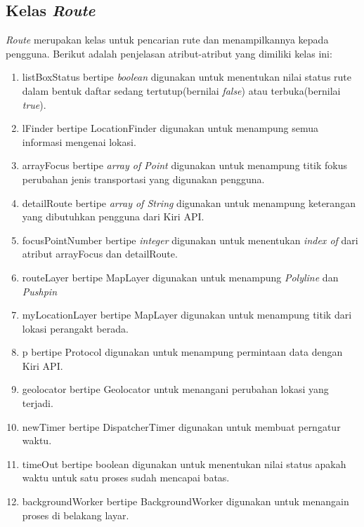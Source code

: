 \subsection{Kelas \textit{Route}}
\label{lab:Kelas Route}
\hspace{0.5cm} \textit{Route} merupakan kelas untuk pencarian rute dan menampilkannya kepada pengguna. Berikut adalah penjelasan atribut-atribut yang dimiliki kelas ini:
\begin{enumerate}
	\item listBoxStatus bertipe \textit{boolean} digunakan untuk menentukan nilai status rute dalam bentuk daftar sedang tertutup(bernilai \textit{false}) atau terbuka(bernilai \textit{true}). 
	\item lFinder bertipe LocationFinder digunakan untuk menampung semua informasi mengenai lokasi.
	\item arrayFocus bertipe \textit{array of Point} digunakan untuk menampung titik fokus perubahan jenis transportasi yang digunakan pengguna.  
	\item detailRoute bertipe \textit{array of String} digunakan untuk menampung keterangan yang dibutuhkan pengguna dari Kiri API.
	\item focusPointNumber bertipe \textit{integer} digunakan untuk menentukan \textit{index of} dari atribut arrayFocus dan detailRoute.
	\item routeLayer bertipe MapLayer digunakan untuk menampung \textit{Polyline} dan \textit{Pushpin}
	\item myLocationLayer bertipe MapLayer digunakan untuk menampung titik dari lokasi perangakt berada.
	\item p bertipe Protocol digunakan untuk menampung permintaan data dengan Kiri API.
	\item geolocator bertipe Geolocator untuk menangani perubahan lokasi yang terjadi.
	\item newTimer bertipe DispatcherTimer digunakan untuk membuat perngatur waktu.
	\item timeOut bertipe boolean digunakan untuk menentukan nilai status apakah waktu untuk satu proses sudah mencapai batas.
	\item backgroundWorker bertipe BackgroundWorker digunakan untuk menangain proses di belakang layar.
\end{enumerate}

